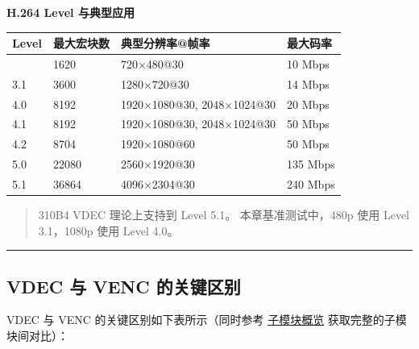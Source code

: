 \textbf{H.264 Level 与典型应用}

\begin{longtable}[]{@{}llll@{}}
\toprule\noalign{}
Level & 最大宏块数 & 典型分辨率@帧率 & 最大码率 \\
\midrule\noalign{}
\endhead
\bottomrule\noalign{}
\endlastfoot
3.0 & 1620 & 720×480@30 & 10 Mbps \\
3.1 & 3600 & 1280×720@30 & 14 Mbps \\
4.0 & 8192 & 1920×1080@30, 2048×1024@30 & 20 Mbps \\
4.1 & 8192 & 1920×1080@30, 2048×1024@30 & 50 Mbps \\
4.2 & 8704 & 1920×1080@60 & 50 Mbps \\
5.0 & 22080 & 2560×1920@30 & 135 Mbps \\
5.1 & 36864 & 4096×2304@30 & 240 Mbps \\
\end{longtable}

\begin{quote}
310B4 VDEC 理论上支持到 Level 5.1。 本章基准测试中，480p 使用 Level
3.1，1080p 使用 Level 4.0。
\end{quote}

\begin{center}\rule{0.5\linewidth}{0.5pt}\end{center}

\subsection{VDEC 与 VENC 的关键区别}\label{src-book-chapter6-h55}

VDEC 与 VENC 的关键区别如下表所示（同时参考
\hyperref[dvpp-modules]{子模块概览} 获取完整的子模块间对比）：

